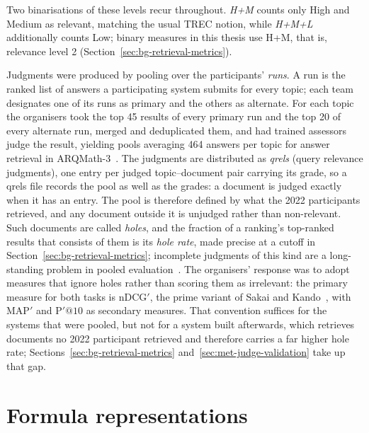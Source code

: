 Two binarisations of these levels recur throughout. \emph{H+M} counts only High and
Medium as relevant, matching the usual TREC notion, while \emph{H+M+L} additionally
counts Low; binary measures in this thesis use H+M, that is, relevance level 2
(Section~\ref{sec:bg-retrieval-metrics}).

Judgments were produced by pooling over the participants' \emph{runs}. A run is
the ranked list of answers a participating system submits for every topic; each
team designates one of its runs as primary and the others as alternate. For each
topic the organisers took the top 45 results of every primary run and the top 20
of every alternate run, merged and deduplicated them, and had trained assessors
judge the result, yielding pools averaging 464 answers per topic for answer
retrieval in ARQMath-3~\cite{mansouri2022arqmath3}. The judgments are
distributed as \emph{qrels} (query relevance judgments), one entry per judged
topic--document pair carrying its grade, so a qrels file records the pool as
well as the grades: a document is judged exactly when it has an entry. The pool
is therefore defined by what the 2022 participants retrieved, and any document
outside it is unjudged rather than non-relevant. Such documents are called
\emph{holes}, and the fraction of a ranking's top-ranked results that consists
of them is its \emph{hole rate}, made precise at a cutoff in
Section~\ref{sec:bg-retrieval-metrics}; incomplete judgments of this kind are a
long-standing problem in pooled evaluation~\cite{buckley2004incomplete}. The
organisers' response was to adopt measures that ignore holes rather than scoring
them as irrelevant: the primary measure for both tasks is $\mathrm{nDCG}'$, the
prime variant of Sakai and Kando~\cite{sakai2008prime}, with $\mathrm{MAP}'$ and
$\mathrm{P}'@10$ as secondary measures. That convention suffices for the systems
that were pooled, but not for a system built afterwards, which retrieves
documents no 2022 participant retrieved and therefore carries a far higher hole
rate; Sections~\ref{sec:bg-retrieval-metrics} and~\ref{sec:met-judge-validation}
take up that gap.

\section{Formula representations}\label{sec:bg-formula-representations}


